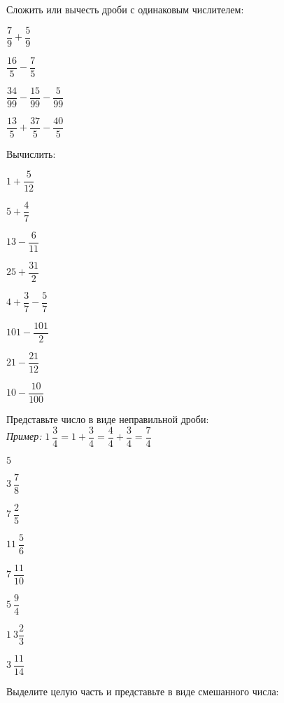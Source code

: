 \begin{class}[number=1]
	\begin{listofex}
		\item Сложить или вычесть дроби с одинаковым числителем:
		\begin{enumcols}[itemcolumns=4]
			\item \( \dfrac{7}{9}+\dfrac{5}{9} \)
			\item \( \dfrac{16}{5}-\dfrac{7}{5} \)
			\item \( \dfrac{34}{99}-\dfrac{15}{99}-\dfrac{5}{99} \)
			\item \( \dfrac{13}{5}+\dfrac{37}{5}-\dfrac{40}{5} \)
		\end{enumcols}
		\item Вычислить:
		\begin{enumcols}[itemcolumns=4]
			\item \( 1+\dfrac{5}{12} \)
			\item \( 5+\dfrac{4}{7} \)
			\item \( 13-\dfrac{6}{11} \)
			\item \( 25+\dfrac{31}{2} \)
			\item \( 4+\dfrac{3}{7}-\dfrac{5}{7} \)
			\item \( 101-\dfrac{101}{2} \)
			\item \( 21-\dfrac{21}{12} \)
			\item \( 10-\dfrac{10}{100} \)
		\end{enumcols}
		\item Представьте число в виде неправильной дроби:\\
		\textit{Пример:} \( 1\:\dfrac{3}{4}=1+\dfrac{3}{4}=\dfrac{4}{4}+\dfrac{3}{4}=\dfrac{7}{4} \)
		\begin{enumcols}[itemcolumns=4]
			\item \( 5 \)
			\item \( 3\:\dfrac{7}{8} \)
			\item \( 7\:\dfrac{2}{5} \)
			\item \( 11\:\dfrac{5}{6} \)
			\item \( 7\:\dfrac{11}{10} \)
			\item \( 5\:\dfrac{9}{4} \)
			\item \( 1\:3\dfrac{2}{3} \)
			\item \( 3\:\dfrac{11}{14} \)
		\end{enumcols}
		\item Выделите целую часть и представьте в виде смешанного числа:\\

\end{listofex}
\end{class}
